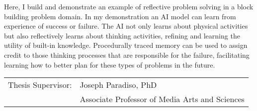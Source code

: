 Here, I build and demonstrate an example of reflective problem solving
in a block building problem domain.  In my demonstration an AI model
can learn from experience of success or failure.  The AI not only
learns about physical activities but also reflectively learns about
thinking activities, refining and learning the utility of built-in
knowledge.  Procedurally traced memory can be used to assign credit to
those thinking processes that are responsible for the failure,
facilitating learning how to better plan for these types of problems
in the future.

\vspace{4mm}
\noindent
\begin{tabular}{rl}
Thesis Supervisor:&Joseph Paradiso, PhD\\
                  &Associate Professor of Media Arts and Sciences
\end{tabular}

\endgroup

\vfill

